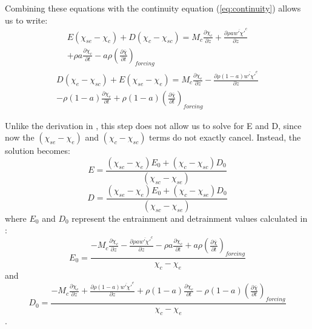 \documentclass[12pt]{article}
\begin{document}
Combining these equations with the continuity equation (\ref{eq:continuity}) 
allows us to write:
\begin{equation}
  \label{eq:entrainment_2}
  \begin{split}
    E (\chi_{se} - \chi_c) + D (\chi_c - \chi_{sc}) 
    = M_c \frac{\partial \chi_c}{\partial z}
    + \frac{\partial \rho a \overline{w' \chi'}^c}{\partial z} \\
    + \rho a \frac{\partial \chi_c}{\partial t}
    - a \rho \left(\frac{\partial \bar{\chi}}{\partial t}\right)_{forcing}
  \end{split}
\end{equation}
\begin{equation}
  \label{eq:detrainment_2}
  \begin{split}
    D (\chi_e - \chi_{sc}) + E (\chi_{se} - \chi_e)
    = M_c \frac{\partial \chi_e}{\partial z}
    - \frac{\partial \rho (1 - a) \overline{w' \chi'}^e}{\partial z} \\
    - \rho (1 - a) \frac{\partial \chi_e}{\partial t}
    + \rho (1 - a) \left(\frac{\partial \bar{\chi}}{\partial t}\right)_{forcing}
  \end{split}
\end{equation}

Unlike the derivation in \cite{Siebesma1995}, this step does not allow us to 
solve for E and D, since now the $(\chi_{se} - \chi_e)$ and 
$(\chi_c - \chi_{sc})$ terms do not exactly cancel.  Instead, the solution 
becomes:
\begin{equation}
  \label{eq:final_entrainment}
    E = \frac{(\chi_{sc} - \chi_e)E_0 + (\chi_c - \chi_{sc})D_0}
             {(\chi_{sc} - \chi_{se})}
\end{equation}
\begin{equation}
  \label{eq:final_detrainment}
    D = \frac{(\chi_{se} - \chi_e)E_0 + (\chi_c - \chi_{se})D_0}
             {(\chi_{sc} - \chi_{se})}
\end{equation}
where $E_0$ and $D_0$ represent the entrainment and detrainment values
calculated in \cite{Siebesma1995}:
\begin{equation}
  \label{eq:E_0_equation}
    E_0 = \frac{- M_c \frac{\partial \chi_c}{\partial z}
        - \frac{\partial \rho a \overline{w' \chi'}^c}{\partial z}
        - \rho a \frac{\partial \chi_c}{\partial t}
        + a \rho \left(\frac{\partial \bar{\chi}}{\partial t}\right)_{forcing}}
        {\chi_c - \chi_e}
\end{equation}
and
\begin{equation}
  \label{eq:D_0_equation}
    D_0 = \frac{- M_c \frac{\partial \chi_e}{\partial z}
        + \frac{\partial \rho (1 - a) \overline{w' \chi'}^e}{\partial z}
        + \rho (1-a) \frac{\partial \chi_e}{\partial t}
     - \rho (1-a) \left(\frac{\partial \bar{\chi}}{\partial t}\right)_{forcing}}
        {\chi_c - \chi_e}
\end{equation}.
\end{document}
